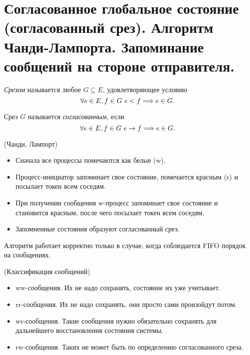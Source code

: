 \section{Согласованное глобальное состояние (согласованный срез).
Алгоритм Чанди-Лампорта. Запоминание сообщений на стороне отправителя.}

\begin{definition}
    \textit{Срезом} называется любое $G \subseteq E$, удовлетворяющее
    условию
    \[
        \forall e \in E, f \in G~ e < f \Longrightarrow e \in G
    .\]
\end{definition}

\begin{definition}
    Срез $G$ называется \textit{согласованным}, если
    \[
        \forall e \in E, f \in G~ e \to f \Longrightarrow e \in G
    .\]
\end{definition}

\begin{algorithm}(Чанди, Лампорт)
    \enewline
    \begin{itemize}
        \item Сначала все процессы помечаются как белые (w).
        \item Процесс-инициатор запоминает свое состояние, помечается красным (r)
            и посылает токен всем соседям.
        \item При получении сообщения w-процесс запоминает свое состояние
            и становится красным, после чего посылает токен всем соседям.
        \item Запомненные состояния образуют согласованный срез.
    \end{itemize}
\end{algorithm}

\begin{remark}
    Алгоритм работает корректно только в случае, когда соблюдается FIFO
    порядок на сообщениях.
\end{remark}

\begin{remark}(Классификация сообщений)

    \begin{itemize}
        \item ww-сообщения. Их не надо сохранять, состояние их уже учитывает. 
        \item rr-сообщения. Их не надо сохранять, они просто сами произойдут потом.
        \item wr-сообщения. Такие сообщения нужно обязательно сохранять для
            дальнейшего восстановления состояния системы.
        \item rw-сообщения. Таких не может быть по определению согласованного среза.
    \end{itemize}
\end{remark}

